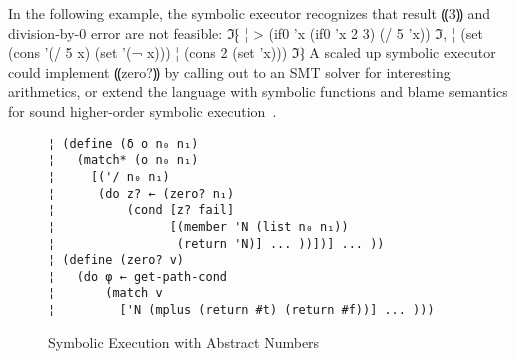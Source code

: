 In the following example, the symbolic executor recognizes that result ⸨3⸩ and
division-by-0 error are not feasible:
ℑ⁅
¦ > (if0 'x (if0 'x 2 3) (/ 5 'x))
ℑ,
¦ (set (cons '(/ 5 x) (set '(¬ x)))
¦      (cons 2 (set 'x)))
ℑ⁆
A scaled up symbolic executor could implement ⸨zero?⸩ by calling out to an SMT
solver for interesting arithmetics, or extend the language with symbolic
functions and blame semantics for sound higher-order symbolic
execution~\cite{dvanhorn:TobinHochstadt2012Higherorder,dvanhorn:Nguyen2015Relatively}.

\begin{figure} %
\begin{lstlisting}
¦ (define (δ o n₀ n₁)
¦   (match* (o n₀ n₁)
¦     [('/ n₀ n₁)
¦      (do z? ← (zero? n₁)
¦          (cond [z? fail]
¦                [(member 'N (list n₀ n₁))
¦                 (return 'N)] ... ))])] ... ))
¦ (define (zero? v)
¦   (do φ ← get-path-cond
¦       (match v 
¦         ['N (mplus (return #t) (return #f))] ... )))
\end{lstlisting}
\vspace{-0.75em}
\caption{Symbolic Execution with Abstract Numbers}
\label{f:symbolic-widen}
\vspace{-1em}
\end{figure} %

\newcommand{\lamif}{«λ⦑IF⦒» }

